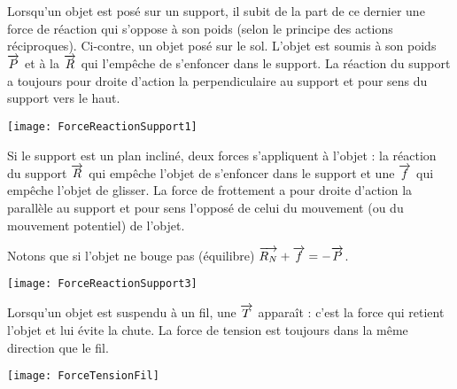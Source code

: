 \vspace{2em}

\begin{minipage}[c]{.65\linewidth}
Lorsqu'un objet est posé sur un support, il subit de la part de ce dernier une force de réaction qui s'oppose à son poids (selon le principe des actions réciproques). Ci-contre, un objet posé sur le sol. L'objet est soumis à son poids $\overrightarrow{P}$ et à la \textbf{} $\overrightarrow{R}$ qui l'empêche de s'enfoncer dans le support. La réaction du support a toujours pour droite d'action la perpendiculaire au support et pour sens du support vers le haut.
\end{minipage}\hfill%
\begin{minipage}[c]{.33\linewidth}
\begin{center}
    \texttt{[image: ForceReactionSupport1]}
\end{center}
\end{minipage}

\vspace{2em}

\begin{minipage}[c]{.65\linewidth}
Si le support est un plan incliné, deux forces s'appliquent à l'objet : la réaction du support $\overrightarrow{R}$ qui empêche l'objet de s'enfoncer dans le support et une \textbf{} $\overrightarrow{f}$ qui empêche l'objet de glisser. La force de frottement a pour droite d'action la parallèle au support et pour sens l'opposé de celui du mouvement (ou du mouvement potentiel) de l'objet.

Notons que si l'objet ne bouge pas (équilibre) $\overrightarrow{R_N} + \overrightarrow{f} = -\overrightarrow{P}$.

\vspace{2em}

\end{minipage}\hfill%
\begin{minipage}[c]{.33\linewidth}
\begin{center}
    \texttt{[image: ForceReactionSupport3]}
\end{center}
\end{minipage}




\begin{minipage}[c]{.65\linewidth}
Lorsqu'un objet est suspendu à un fil, une  $\overrightarrow{T}$ apparaît : c'est la force qui retient l'objet et lui évite la chute. La force de tension est toujours dans la même direction que le fil.
\end{minipage}\hfill%
\begin{minipage}[c]{.33\linewidth}
\begin{center}
    \texttt{[image: ForceTensionFil]}
\end{center}
\end{minipage}


